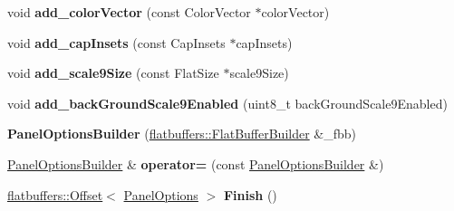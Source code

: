 \begin{DoxyCompactItemize}
\item 
\mbox{\label{structflatbuffers_1_1PanelOptionsBuilder_acd4f41be2edd955e08a4e195f1b1d6b8}} 
void {\bfseries add\+\_\+color\+Vector} (const Color\+Vector $\ast$color\+Vector)
\item 
\mbox{\label{structflatbuffers_1_1PanelOptionsBuilder_adcf866cb51b49d31b70c7e237a6c9085}} 
void {\bfseries add\+\_\+cap\+Insets} (const Cap\+Insets $\ast$cap\+Insets)
\item 
\mbox{\label{structflatbuffers_1_1PanelOptionsBuilder_a14d35e489f4be62fbf9493f70322685c}} 
void {\bfseries add\+\_\+scale9\+Size} (const Flat\+Size $\ast$scale9\+Size)
\item 
\mbox{\label{structflatbuffers_1_1PanelOptionsBuilder_acc9c485b0315b560e1405003a024bad1}} 
void {\bfseries add\+\_\+back\+Ground\+Scale9\+Enabled} (uint8\+\_\+t back\+Ground\+Scale9\+Enabled)
\item 
\mbox{\label{structflatbuffers_1_1PanelOptionsBuilder_a1ea5492e9ebef8d87d9b71a272efe18f}} 
{\bfseries Panel\+Options\+Builder} (\hyperlink{classflatbuffers_1_1FlatBufferBuilder}{flatbuffers\+::\+Flat\+Buffer\+Builder} \&\+\_\+fbb)
\item 
\mbox{\label{structflatbuffers_1_1PanelOptionsBuilder_a6f42d49d22f74fb4de02058d7119f646}} 
\hyperlink{structflatbuffers_1_1PanelOptionsBuilder}{Panel\+Options\+Builder} \& {\bfseries operator=} (const \hyperlink{structflatbuffers_1_1PanelOptionsBuilder}{Panel\+Options\+Builder} \&)
\item 
\mbox{\label{structflatbuffers_1_1PanelOptionsBuilder_a89305f1bd5b3a6a30bfbb364d9d8e4d9}} 
\hyperlink{structflatbuffers_1_1Offset}{flatbuffers\+::\+Offset}$<$ \hyperlink{structflatbuffers_1_1PanelOptions}{Panel\+Options} $>$ {\bfseries Finish} ()
\end{DoxyCompactItemize}
